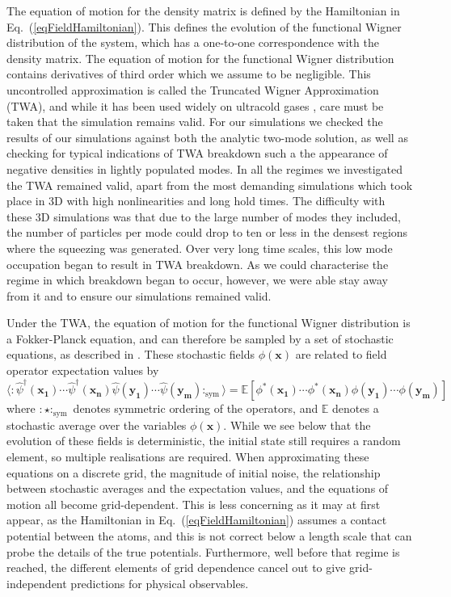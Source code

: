 \documentclass{iopart}
\begin{document}
The equation of motion for the density matrix is defined by the Hamiltonian in Eq.~(\ref{eqFieldHamiltonian}).  This defines the evolution of the functional Wigner distribution of the system, which has a one-to-one correspondence with the density matrix.  The equation of motion for the functional Wigner distribution contains derivatives of third order which we assume to be negligible.  This uncontrolled approximation is called the Truncated Wigner Approximation (TWA), and while it has been used widely on ultracold gases \cite{atomlaserWigner,orOtherUCGWigner}, care must be taken that the simulation remains valid. For our simulations we checked the results of our simulations against both the analytic two-mode solution, as well as checking for typical indications of TWA breakdown such a the appearance of negative densities in lightly populated modes. In all the regimes we investigated the TWA remained valid, apart from the most demanding simulations which took place in 3D with high nonlinearities and long hold times. The difficulty with these 3D simulations was that due to the large number of modes they included, the number of particles per mode could drop to ten or less in the densest regions where the squeezing was generated. Over very long time scales, this low mode occupation began to result in TWA breakdown. As we could characterise the regime in which breakdown began to occur, however, we were able stay away from it and to ensure our simulations remained valid.

Under the TWA, the equation of motion for the functional Wigner distribution is a Fokker-Planck equation, and can therefore be sampled by a set of stochastic equations, as described in \cite{GardinerQuantumNoise}.  These stochastic fields $\phi(\mathbf{x})$ are related to field operator expectation values by  
\begin{equation}
\langle :\hat{\psi}^\dagger(\mathbf{x_1})\cdots\hat{\psi}^\dagger(\mathbf{x_n})\hat{\psi}(\mathbf{y_1})\cdots\hat{\psi}(\mathbf{y_m}):_{\mbox{sym}}\rangle = \mathbb{E}\left[\phi^*(\mathbf{x_1})\cdots\phi^*(\mathbf{x_n})\phi(\mathbf{y_1})\cdots\phi(\mathbf{y_m})\right]
\label{eqExpectationRelations}
\end{equation}
%
where $:\star:_{\mbox{sym}}$ denotes symmetric ordering of the operators, and $\mathbb{E}$ denotes a stochastic average over the variables $\phi(\mathbf{x})$.  While we see below that the evolution of these fields is deterministic, the initial state still requires a random element, so multiple realisations are required.  When approximating these equations on a discrete grid, the magnitude of initial noise, the relationship between stochastic averages and the expectation values, and the equations of motion all become grid-dependent.  This is less concerning as it may at first appear, as the Hamiltonian in Eq.~(\ref{eqFieldHamiltonian}) assumes a contact potential between the atoms, and this is not correct below a length scale that can probe the details of the true potentials.  Furthermore, well before that regime is reached, the different elements of grid dependence cancel out to give grid-independent predictions for physical observables.
\end{document}

